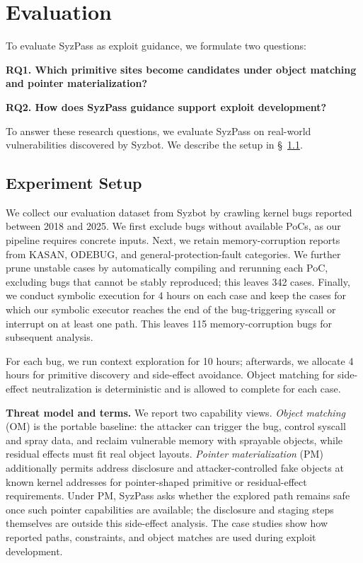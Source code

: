 \section{Evaluation}
To evaluate SyzPass as exploit guidance, we formulate two questions:

\noindent\textbf{RQ1. Which primitive sites become candidates under object matching and pointer materialization?}

\noindent\textbf{RQ2. How does SyzPass guidance support exploit development?}

To answer these research questions, we evaluate SyzPass on real-world vulnerabilities discovered by Syzbot. We describe the setup in \S~\ref{expset}.



\subsection{Experiment Setup}\label{expset}

We collect our evaluation dataset from Syzbot by crawling kernel bugs reported between 2018 and 2025. We first exclude bugs without available PoCs, as our pipeline requires concrete inputs. Next, we retain memory-corruption reports from KASAN, ODEBUG, and general-protection-fault categories. We further prune unstable cases by automatically compiling and rerunning each PoC, excluding bugs that cannot be stably reproduced; this leaves 342 cases. Finally, we conduct symbolic execution for 4 hours on each case and keep the cases for which our symbolic executor reaches the end of the bug-triggering syscall or interrupt on at least one path. This leaves 115 memory-corruption bugs for subsequent analysis.

For each bug, we run context exploration for 10 hours; afterwards, we allocate 4 hours for primitive discovery and side-effect avoidance. Object matching for side-effect neutralization is deterministic and is allowed to complete for each case.

\noindent\textbf{Threat model and terms.} We report two capability views. \emph{Object matching} (OM) is the portable baseline: the attacker can trigger the bug, control syscall and spray data, and reclaim vulnerable memory with sprayable objects, while residual effects must fit real object layouts. \emph{Pointer materialization} (PM) additionally permits address disclosure and attacker-controlled fake objects at known kernel addresses for pointer-shaped primitive or residual-effect requirements. Under PM, SyzPass asks whether the explored path remains safe once such pointer capabilities are available; the disclosure and staging steps themselves are outside this side-effect analysis. The case studies show how reported paths, constraints, and object matches are used during exploit development.

